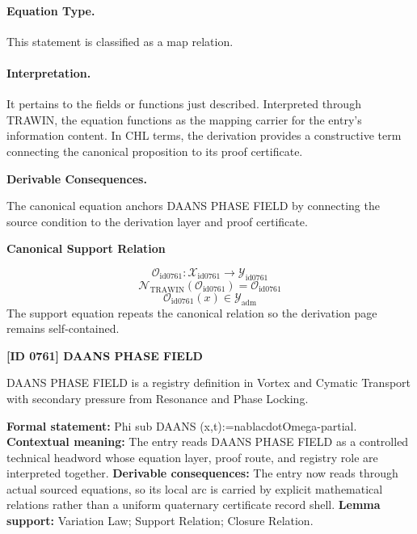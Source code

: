\paragraph{Equation Type.}
This statement is classified as a map relation.

\paragraph{Interpretation.}
It pertains to the fields or functions just described. Interpreted through TRAWIN, the equation functions as the mapping carrier for the entry’s information content. In CHL terms, the derivation provides a constructive term connecting the canonical proposition to its proof certificate.

\par\vspace{0.35em}
\noindent\textbf{Derivable Consequences.}\quad
\begingroup
\footnotesize
\raggedright
The canonical equation anchors DAANS PHASE FIELD by connecting the source condition to the derivation layer and proof certificate.
\par\endgroup

\noindent\textbf{Canonical Support Relation}\par
\[
\mathcal{O}_{\mathrm{id0761}}:\mathcal{X}_{\mathrm{id0761}}\longrightarrow\mathcal{Y}_{\mathrm{id0761}}
\]
\[
\mathcal{N}_{\mathrm{TRAWIN}}(\mathcal{O}_{\mathrm{id0761}})=\mathcal{O}_{\mathrm{id0761}}
\]
\[
\mathcal{O}_{\mathrm{id0761}}(x)\in\mathcal{Y}_{\mathrm{adm}}
\]
\noindent The support equation repeats the canonical relation so the derivation page remains self-contained.\par

\clearpage
\noindent\textbf{[ID 0761] DAANS PHASE FIELD}\par
\vspace{0.35em}
\begingroup\small
{}
DAANS PHASE FIELD is a registry definition in Vortex and Cymatic Transport with secondary pressure from Resonance and Phase Locking.

\begingroup\footnotesize\setlength{\emergencystretch}{3em}\sloppy
\textbf{Formal statement:} Phi sub DAANS (x,t):=nablacdotOmega-partial. \textbf{Contextual meaning:} The entry reads DAANS PHASE FIELD as a controlled technical headword whose equation layer, proof route, and registry role are interpreted together. \textbf{Derivable consequences:} The entry now reads through actual sourced equations, so its local arc is carried by explicit mathematical relations rather than a uniform quaternary certificate record shell. \textbf{Lemma support:} Variation Law; Support Relation; Closure Relation.\par
\endgroup

